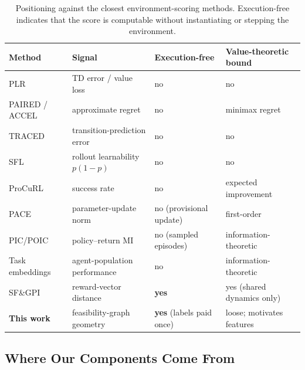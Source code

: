\documentclass[twoside]{article}
\begin{document}
\begin{table}[h]
\centering
\small
\caption{Positioning against the closest environment-scoring methods. Execution-free indicates that the score is computable without instantiating or stepping the environment.}
\label{tab:positioning}
\small
\begin{tabular}{>{\raggedright\arraybackslash}p{5.3cm}>{\raggedright\arraybackslash}p{3.9cm}>{\raggedright\arraybackslash}p{2.9cm}>{\raggedright\arraybackslash}p{3.1cm}}
\toprule
Method & Signal & Execution-free & Value-theoretic bound \\
\midrule
PLR \citep{jiang2021prioritized}          & TD error / value loss        & no  & no \\
PAIRED / ACCEL \citep{dennis2020emergent, parker2022evolving} & approximate regret & no  & minimax regret \\
TRACED \citep{cho2025traced}              & transition-prediction error  & no  & no \\
SFL \citep{rutherford2024no}              & rollout learnability $p(1{-}p)$ & no & no \\
ProCuRL \citep{tzannetos2023proximal}     & success rate                 & no  & expected improvement \\
PACE \citep{yuan2026pace}                 & parameter-update norm        & no (provisional update) & first-order \\
PIC/POIC \citep{furuta2021policy}         & policy--return MI            & no (sampled episodes) & information-theoretic \\
Task embeddings \citep{mahajan2024learning} & agent-population performance & no & information-theoretic \\
SF\&GPI \citep{barreto2018transfer}       & reward-vector distance       & \textbf{yes} & yes (shared dynamics only) \\
\textbf{This work}                        & feasibility-graph geometry   & \textbf{yes} (labels paid once) & loose; motivates features \\
\bottomrule
\end{tabular}
\end{table}

\subsection{Where Our Components Come From}
\label{sec:related}
\end{document}
